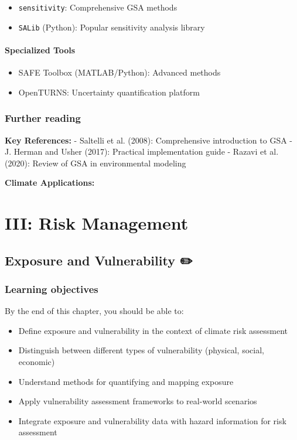 \documentclass[
  letterpaper,
  DIV=11,
  numbers=noendperiod]{scrreprt}
\providecommand{\tightlist}{%
  \setlength{\itemsep}{0pt}\setlength{\parskip}{0pt}}
\begin{document}
\begin{itemize}
\tightlist
\item
  \texttt{sensitivity}: Comprehensive GSA methods
\item
  \texttt{SALib} (Python): Popular sensitivity analysis library
\end{itemize}

\subsection{Specialized Tools}\label{specialized-tools}

\begin{itemize}
\tightlist
\item
  SAFE Toolbox (MATLAB/Python): Advanced methods
\item
  OpenTURNS: Uncertainty quantification platform
\end{itemize}

\section*{Further reading}\label{further-reading-12}


\textbf{Key References:} - Saltelli et al. (2008): Comprehensive
introduction to GSA - J. Herman and Usher (2017): Practical
implementation guide - Razavi et al. (2020): Review of GSA in
environmental modeling

\textbf{Climate Applications:}

\part{\textbf{III: Risk Management}}

\chapter{Exposure and Vulnerability
✏️}\label{exposure-and-vulnerability-1}

\section{Learning objectives}\label{learning-objectives-13}

By the end of this chapter, you should be able to:

\begin{itemize}
\tightlist
\item
  Define exposure and vulnerability in the context of climate risk
  assessment
\item
  Distinguish between different types of vulnerability (physical,
  social, economic)
\item
  Understand methods for quantifying and mapping exposure
\item
  Apply vulnerability assessment frameworks to real-world scenarios
\item
  Integrate exposure and vulnerability data with hazard information for
  risk assessment
\end{itemize}
\end{document}
